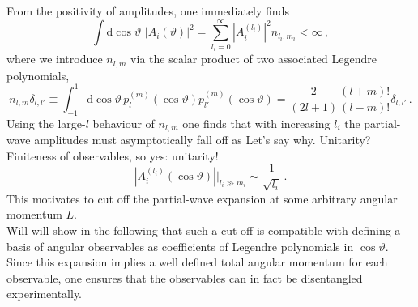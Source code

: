 \documentclass[aps,prd,reprint,nofootinbib,preprintnumbers]{revtex4}
\newcommand{\rmdx}[1]{\mbox{d} #1 \,} %
\renewcommand{\theta}{\vartheta}
\newcommand{\danny}[1]{{\color{purple}#1}}
\newcommand{\fred}[1]{{\color{brown!85!black}#1}}
\begin{document}
From the positivity of amplitudes, one immediately finds
\begin{equation}
    \int \rmdx{\cos\theta}  \, |A_i(\theta)|^2 = \sum_{l_i = 0}^\infty |A_i^{(l_i)}|^2 n_{l_i, m_i} < \infty\,,
\end{equation}
where we introduce $n_{l,m}$ via the scalar product of two associated Legendre polynomials,
\begin{equation}
    \label{eq:legendre-scalar-product}
    n_{l, m} \delta_{l, l'} \equiv \int_{-1}^1 \rmdx{\cos\theta} p_{l}^{(m)}(\cos\theta) p_{l'}^{(m)} (\cos\theta)  = \frac{2}{(2 l + 1)} \frac{(l + m)!}{(l - m)!} \delta_{l, l'}\,.
\end{equation}
Using the large-$l$ behaviour of $n_{l,m}$ one finds that with increasing $l_i$ the partial-wave amplitudes must asymptotically fall off as \fred{Let's say why. Unitarity?} \danny{Finiteness of observables, so yes: unitarity!}
\begin{equation}
    |A_i^{(l_i)}(\cos\theta)| \Big|_{l_i \gg m_i} \sim \frac{1}{\sqrt{l_i}}\,.
\end{equation}
This motivates to cut off the partial-wave expansion at some arbitrary angular momentum $L$.\\

Will will show in the following that such a cut off
is compatible with defining a basis of angular observables as coefficients of Legendre polynomials in $\cos\theta$. Since this expansion implies
a well defined total angular momentum for each observable, one ensures that the observables can in fact be disentangled experimentally.\\
\end{document}

